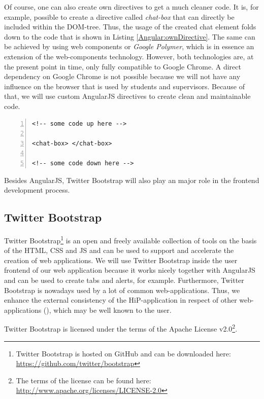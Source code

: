 Of course, one can also create own directives to get a much cleaner code. It is, for example, possible to create a directive called \textit{chat-box} that can directly be included within the \ac{DOM}-tree. Thus, the usage of the created chat element folds down to the code that is shown in Listing \ref{Angular:ownDirective}. The same can be achieved by using web components or \emph{Google Polymer}, which is in essence an extension of the web-components technology. However, both technologies are, at the present point in time, only fully compatible to Google Chrome. A direct dependency on Google Chrome is not possible because we will not have any influence on the browser that is used by students and supervisors. Because of that, we will use custom AngularJS directives to create clean and maintainable code.

\begin{lstlisting}[numbers=left,caption={Simple example that shows the usage of a custom directive.},label=Angular:ownDirective,frame=tlbr,breaklines]
<!-- some code up here -->

<chat-box> </chat-box>

<!-- some code down here -->
\end{lstlisting}

Besides AngularJS, Twitter Bootstrap will also play an major role in the frontend development process.
 
\subsection{Twitter Bootstrap}
Twitter Bootstrap\footnote{Twitter Bootstrap is hosted on GitHub and can be downloaded here: \url{https://github.com/twitter/bootstrap}} is an open and freely available collection of tools on the basis of the \ac{HTML}, \ac{CSS} and \ac{JS} and can be used to support and accelerate the creation of web applications. We will use Twitter Bootstrap inside the user frontend of our web application because it works nicely together with AngularJS and can be used to create tabs and alerts, for example. Furthermore, Twitter Bootstrap is nowadays used by a lot of common web-applications. Thus, we enhance the external consistency of the \ac{HiP}-application in respect of other web-applications (\cite{lidwell2010universal}), which may be well known to the user. 

Twitter Bootstrap is licensed under the terms of the Apache License v2.0\footnote{The terms of the license can be found here: \url{http://www.apache.org/licenses/LICENSE-2.0}}.


